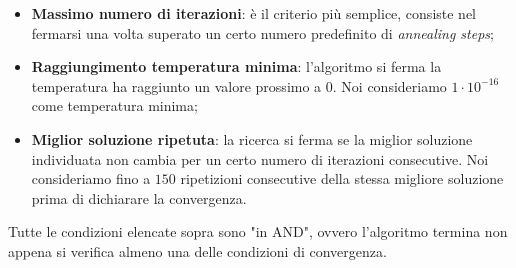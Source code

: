 \begin{itemize}
    \item \textbf{Massimo numero di iterazioni}: è il criterio più semplice, consiste nel fermarsi una volta superato un certo numero predefinito di \textit{annealing steps};
    \item \textbf{Raggiungimento temperatura minima}: l'algoritmo si ferma la temperatura ha raggiunto un valore prossimo a 0. Noi consideriamo $1 \cdot 10^{-16}$ come temperatura minima;
    \item \textbf{Miglior soluzione ripetuta}: la ricerca si ferma se la miglior soluzione individuata non cambia per un certo numero di iterazioni consecutive. Noi consideriamo fino a $150$ ripetizioni consecutive della stessa migliore soluzione prima di dichiarare la convergenza.
\end{itemize}

\noindent Tutte le condizioni elencate sopra sono "in AND", ovvero l'algoritmo termina non appena si verifica almeno una delle condizioni di convergenza.
